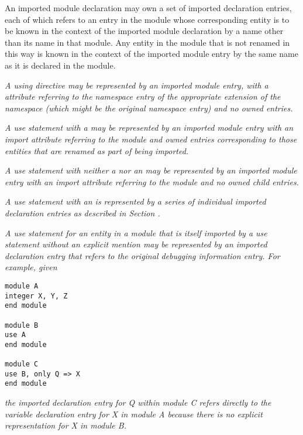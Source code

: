 An imported module declaration may own a set of imported
declaration entries, each of which refers to an entry in the
module whose corresponding entity is to be known in the context
of the imported module declaration by a name other than its
name in that module. Any entity in the module that is not
renamed in this way is known in the context of the imported
module entry by the same name as it is declared in the module.

\textit{A  using directive
may be represented by an imported 
module\hypertarget{chap:DWATimportnamespaceusingdirective}{}
entry, with a \DWATimportDEFN{} attribute referring to the namespace
entry of the appropriate extension of the namespace (which
might be the original namespace entry) and no owned entries.
}

\textit{A  use statement 
with a  may be
represented by an imported module entry with an import
attribute referring to the module and owned entries
corresponding to those entities that are renamed as part of
being imported.
}

\textit{A  use statement
with neither a  nor
an  may be represented by an imported module
entry with an import attribute referring to the module and
no owned child entries.
}

\textit{A use statement with an  is represented by a
series of individual imported declaration entries as described
in Section .
}

\textit{A  use statement for an entity in a module that is
itself imported by a use statement without an explicit mention
may be represented by an imported declaration entry that refers
to the original debugging information entry. For example, given
}
\vspace{2mm}
\begin{lstlisting}
module A
integer X, Y, Z
end module

module B
use A
end module

module C
use B, only Q => X
end module

\end{lstlisting}
\textit{the imported declaration entry for Q within module C refers
directly to the variable declaration entry for X in module A
because there is no explicit representation for X in module B.
}

